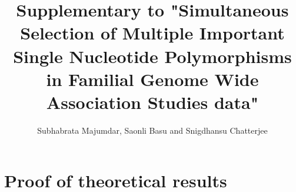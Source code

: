 \documentclass[aoas,preprint]{imsart}
\numberwithin{equation}{section}
\begin{document}
\newtheorem{Theorem}{Theorem}[section]
\newtheorem{Lemma}[Theorem]{Lemma}
\newtheorem{Corollary}[Theorem]{Corollary}
\newtheorem{Proposition}[Theorem]{Proposition}
\newtheorem{Conjecture}[Theorem]{Conjecture}
\theoremstyle{definition} \newtheorem{Definition}[Theorem]{Definition}

\title{Supplementary to "Simultaneous Selection of Multiple Important Single Nucleotide Polymorphisms in Familial Genome Wide Association Studies data"}
\date{}
\author{Subhabrata Majumdar, Saonli Basu and Snigdhansu Chatterjee}
\maketitle

\appendix

\section{Proof of theoretical results}
\end{document}
